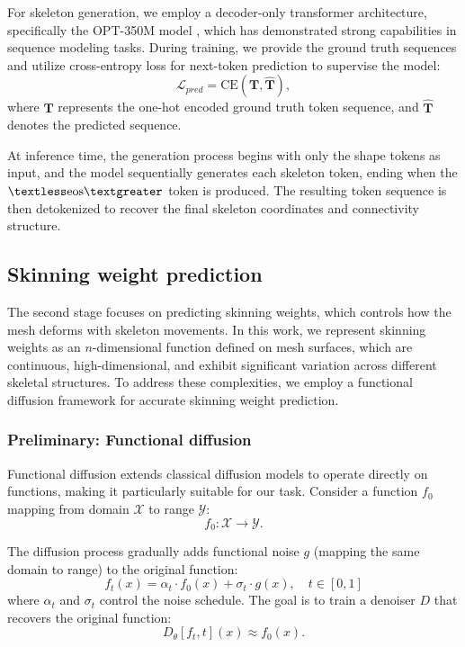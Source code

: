 For skeleton generation, we employ a decoder-only transformer architecture, specifically the OPT-350M model \cite{zhang2022opt}, which has demonstrated strong capabilities in sequence modeling tasks.  During training, we provide the ground truth sequences and utilize cross-entropy loss for next-token prediction to supervise the model: \begin{equation} 
    \mathcal{L}_{pred} = \mathrm{CE}(\mathbf{T}, \mathbf{\hat{T}}) ,
\end{equation} 
where $\mathbf{T}$ represents the one-hot encoded ground truth token sequence, and $\mathbf{\hat{T}}$ denotes the predicted sequence.


At inference time, the generation process begins with only the shape tokens as input, and the model sequentially generates each skeleton token, ending when the $\textless \mathrm{eos} \textgreater$ token is produced. The resulting token sequence is then detokenized to recover the final skeleton coordinates and connectivity structure.

\subsection{Skinning weight prediction}
\label{skin}


The second stage focuses on predicting skinning weights, which controls how the mesh deforms with skeleton movements. In this work, we represent skinning weights as an $n$-dimensional function defined on mesh surfaces, which are continuous, high-dimensional, and exhibit significant variation across different skeletal structures. To address these complexities, we employ a functional diffusion framework for accurate skinning weight prediction.


\subsubsection{Preliminary: Functional diffusion}

Functional diffusion \cite{zhang2024functional} extends classical diffusion models to operate directly on functions, making it particularly suitable for our task. Consider a function $f_0$ mapping from domain $\mathcal{X}$ to range $\mathcal{Y}$:
\begin{equation}
f_0 : \mathcal{X} \rightarrow \mathcal{Y}.
\end{equation}

The diffusion process gradually adds functional noise $g$ (mapping the same domain to range) to the original function:
\begin{equation}
f_t(x) = \alpha_t \cdot f_0(x) + \sigma_t \cdot g(x), \quad t \in [0, 1]
\end{equation}
where $\alpha_t$ and $\sigma_t$ control the noise schedule. The goal is to train a denoiser $D$ that recovers the original function:
\begin{equation}
D_\theta[f_t, t](x) \approx f_0(x).
\end{equation}

